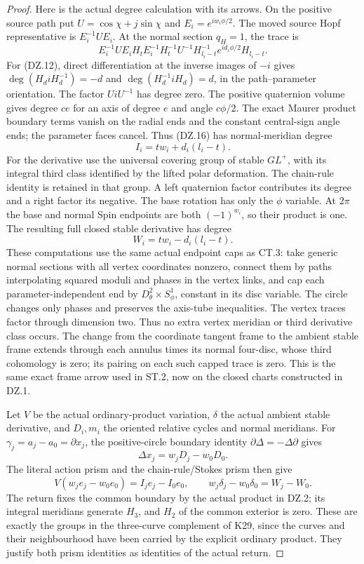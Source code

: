 \begin{proof}
Here is the actual degree calculation with its arrows. On the
positive source path put \(U=\cos\chi+j\sin\chi\) and
\(E_i=e^{iw_i\phi/2}\). The moved source Hopf representative is
\(E_i^{-1}UE_i\). At the normal section \(q_H=1\), the trace is
\[
 E_i^{-1}UE_i H_t E_i^{-1}H_t^{-1}U^{-1}
              H_{l_i-t}^{-1}e^{id_i\phi/2}H_{l_i-t}. \tag{DZ.16}
\]
For (DZ.12), direct differentiation at the inverse images of
\(-i\) gives
\(\deg(H_diH_d^{-1})=-d\) and
\(\deg(H_d^{-1}iH_d)=d\), in the path--parameter orientation.
The factor \(UiU^{-1}\) has degree zero. The positive quaternion
volume gives degree \(c e\) for an axis of degree \(e\) and angle
\(c\phi/2\). The exact Maurer product boundary terms vanish on
the radial ends and the constant central-sign angle ends; the
parameter faces cancel. Thus (DZ.16) has normal-meridian degree
\[
                    I_i=t w_i+d_i(l_i-t).            \tag{DZ.17}
\]
For the derivative use the universal covering group of stable
\(GL^+\), with its integral third class identified by the lifted
polar deformation. The chain-rule identity is retained in that
group. A left quaternion factor contributes its degree and a right
factor its negative. The base rotation has only the \(\phi\)
variable. At \(2\pi\) the base and normal Spin endpoints are both
\((-1)^{w_i}\), so their product is one. The resulting full
closed stable derivative has degree
\[
                    W_i=t w_i-d_i(l_i-t).            \tag{DZ.18}
\]
These computations use the same actual endpoint caps as CT.3:
take generic normal sections with all vertex coordinates nonzero,
connect them by paths interpolating squared moduli and phases in
the vertex links, and cap each parameter-independent end by
\(D^2_\theta\times S^1_\phi\), constant in its disc variable.
The circle changes only phases and preserves the axis-tube
inequalities. The vertex traces factor through dimension two.
Thus no extra vertex meridian or third derivative class occurs.
The change from the coordinate tangent frame to the ambient
stable frame extends through each annulus times its normal
four-disc, whose third cohomology is zero; its pairing on each
such capped trace is zero. This is the same exact frame arrow
used in ST.2, now on the closed charts constructed in DZ.1.

Let \(V\) be the actual ordinary-product variation, \(\delta\)
the actual ambient stable derivative, and \(D_i,m_i\) the
oriented relative cycles and normal meridians. For
\(\gamma_j=a_j-a_0=\partial x_j\), the positive-circle boundary
identity \(\partial\Delta=-\Delta\partial\) gives
\[
             \Delta x_j=w_jD_j-w_0D_0 .
\]
The literal action prism and the chain-rule/Stokes prism then give
\[
 V(w_je_j-w_0e_0)=I_je_j-I_0e_0,\qquad
 w_j\delta_j-w_0\delta_0=W_j-W_0.                    \tag{DZ.19}
\]
The return fixes the common boundary by the actual product in
DZ.2; its integral meridians generate \(H_3\), and \(H_2\) of the
common exterior is zero. These are exactly the groups in the
three-curve complement of K29, since the curves and their
neighbourhood have been carried by the explicit ordinary product.
They justify both prism identities as identities of the actual
return.


\end{proof}
